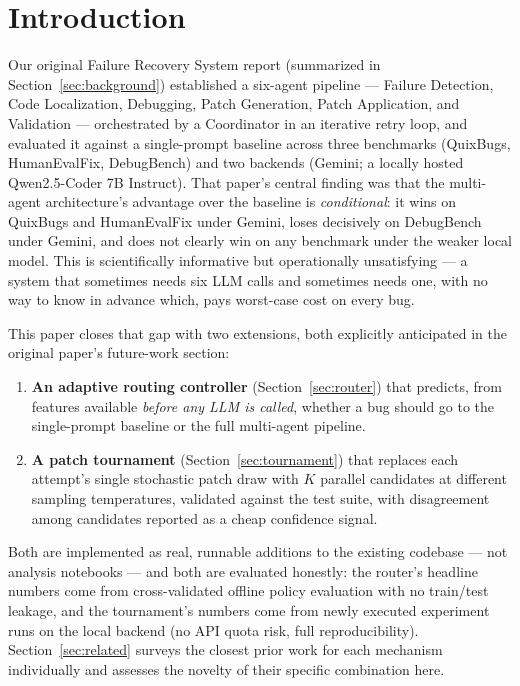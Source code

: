 \documentclass[conference]{IEEEtran}
\begin{document}
\begin{abstract}
\end{abstract}

\section{Introduction}
\label{sec:intro}
Our original Failure Recovery System report (summarized in Section~\ref{sec:background})
established a six-agent pipeline — Failure Detection, Code Localization, Debugging, Patch Generation, Patch Application, and Validation — orchestrated by a Coordinator in an iterative retry loop, and evaluated it against a single-prompt baseline across three benchmarks (QuixBugs, HumanEvalFix, DebugBench) and two backends (Gemini; a locally hosted Qwen2.5-Coder 7B Instruct). That paper's central finding was that the multi-agent architecture's advantage over the baseline is \emph{conditional}: it wins on QuixBugs and HumanEvalFix under Gemini, loses decisively on DebugBench under Gemini, and does not clearly win on any benchmark under the weaker local model. This is scientifically informative but operationally unsatisfying — a system that sometimes needs six LLM calls and sometimes needs one, with no way to know in advance which, pays worst-case cost on every bug.

This paper closes that gap with two extensions, both explicitly anticipated in the original paper's future-work section:

\begin{enumerate}
    \item \textbf{An adaptive routing controller} (Section~\ref{sec:router}) that predicts, from features available \emph{before any LLM is called}, whether a bug should go to the single-prompt baseline or the full multi-agent pipeline.
    \item \textbf{A patch tournament} (Section~\ref{sec:tournament}) that replaces each attempt's single stochastic patch draw with $K$ parallel candidates at different sampling temperatures, validated against the test suite, with disagreement among candidates reported as a cheap confidence signal.
\end{enumerate}

Both are implemented as real, runnable additions to the existing codebase — not analysis notebooks — and both are evaluated honestly: the router's headline numbers come from cross-validated offline policy evaluation with no train/test leakage, and the tournament's numbers come from newly executed experiment runs on the local backend (no API quota risk, full reproducibility). Section~\ref{sec:related} surveys the closest prior work for each mechanism individually and assesses the novelty of their specific combination here.
\end{document}
